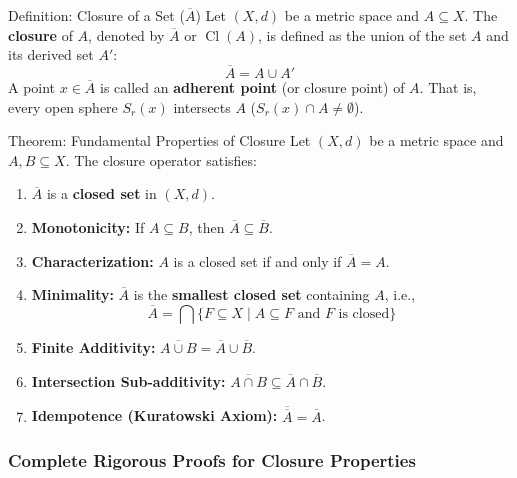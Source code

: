 \documentclass[11pt,a4paper]{article}
\begin{document}
\begin{defbox}{Definition: Closure of a Set ($\overline{A}$)}
Let $(X, d)$ be a metric space and $A \subseteq X$. The \textbf{closure} of $A$, denoted by $\overline{A}$ or $\operatorname{Cl}(A)$, is defined as the union of the set $A$ and its derived set $A'$:
\begin{equation}
    \overline{A} = A \cup A'
\end{equation}
A point $x \in \overline{A}$ is called an \textbf{adherent point} (or closure point) of $A$. That is, every open sphere $S_r(x)$ intersects $A$ ($S_r(x) \cap A \neq \emptyset$).
\end{defbox}

\begin{formulabox}{Theorem: Fundamental Properties of Closure}
Let $(X, d)$ be a metric space and $A, B \subseteq X$. The closure operator satisfies:
\begin{enumerate}
    \item[\textbf{(i)}] $\overline{A}$ is a \textbf{closed set} in $(X, d)$.
    \item[\textbf{(ii)}] \textbf{Monotonicity:} If $A \subseteq B$, then $\overline{A} \subseteq \overline{B}$.
    \item[\textbf{(iii)}] \textbf{Characterization:} $A$ is a closed set if and only if $\overline{A} = A$.
    \item[\textbf{(iv)}] \textbf{Minimality:} $\overline{A}$ is the \textbf{smallest closed set} containing $A$, i.e.,
    $$\overline{A} = \bigcap \{ F \subseteq X \mid A \subseteq F \text{ and } F \text{ is closed} \}$$
    \item[\textbf{(v)}] \textbf{Finite Additivity:} $\overline{A \cup B} = \overline{A} \cup \overline{B}$.
    \item[\textbf{(vi)}] \textbf{Intersection Sub-additivity:} $\overline{A \cap B} \subseteq \overline{A} \cap \overline{B}$.
    \item[\textbf{(vii)}] \textbf{Idempotence (Kuratowski Axiom):} $\overline{\overline{A}} = \overline{A}$.
\end{enumerate}
\end{formulabox}

\subsubsection{Complete Rigorous Proofs for Closure Properties}
\end{document}
